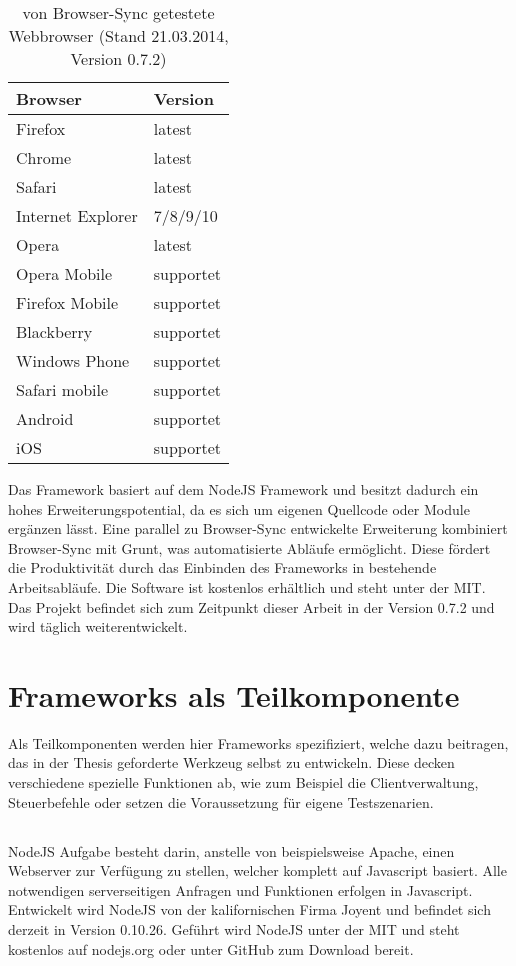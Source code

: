 		\begin{table}[H]
 		\centering
			\begin{tabular}{| p{5cm} | p{5cm} |}
			
			\hline
				Browser 	& 	Version\\
			\hline
			\hline
				Firefox	&	latest\\
				Chrome	&	latest\\
				Safari	&	latest\\
				Internet Explorer	&	7/8/9/10\\
				Opera	&	latest\\
				Opera Mobile	&	supportet\\
				Firefox Mobile	&	supportet\\
				Blackberry	&	supportet\\
				Windows Phone	&	supportet\\
				Safari mobile	&	supportet\\	
				Android	&	supportet\\
				iOS		&	supportet\\
				\hline
				\end{tabular}
			\caption{von Browser-Sync getestete \Gls{Webbrowser} (Stand 21.03.2014, Version 0.7.2)}
	\end{table}
	
	Das \Gls{Framework} basiert auf dem \gls{NodeJS} \Gls{Framework} und besitzt dadurch ein hohes Erweiterungspotential, da es sich um eigenen Quellcode oder Module ergänzen lässt. Eine parallel zu Browser-Sync entwickelte Erweiterung kombiniert Browser-Sync mit \Gls{Grunt}, was automatisierte Abläufe ermöglicht. Diese fördert die Produktivität durch das Einbinden des \Gls{Framework}s in bestehende Arbeitsabläufe. Die Software ist kostenlos erhältlich und steht unter der \Gls{MIT}. Das Projekt befindet sich zum Zeitpunkt dieser Arbeit in der Version 0.7.2 und wird täglich weiterentwickelt.

\pagebreak
\section{Frameworks als Teilkomponente}
	Als Teilkomponenten werden hier \Gls{Framework}s spezifiziert, welche dazu beitragen, das in der Thesis geforderte Werkzeug selbst zu entwickeln. Diese decken verschiedene spezielle Funktionen ab, wie zum Beispiel die Clientverwaltung, Steuerbefehle oder setzen die Voraussetzung für eigene \Gls{Test}szenarien.
	
	\subsection{}
	\gls{NodeJS} Aufgabe besteht darin, anstelle von beispielsweise \Gls{Apache}, einen Webserver zur Verfügung zu stellen, welcher komplett auf \Gls{Javascript} basiert. Alle notwendigen serverseitigen Anfragen und Funktionen erfolgen in \Gls{Javascript}. Entwickelt wird \gls{NodeJS} von der kalifornischen Firma Joyent und befindet sich derzeit in Version 0.10.26. Geführt wird \gls{NodeJS} unter der \Gls{MIT} und steht kostenlos auf nodejs.org oder unter GitHub zum Download bereit.
	
